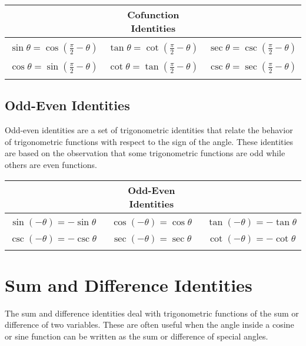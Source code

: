 \documentclass[11pt]{article}
\begin{document}
\begin{table}[H]
    \centering
    \begin{tabular}{|ccc|}
    \hline
         & Cofunction Identities &  \\
         \hline
         &&\\
        $\displaystyle \sin\theta = \cos\left(\frac{\pi}{2} - \theta\right)$ & $\displaystyle \tan\theta = \cot\left(\frac{\pi}{2} - \theta\right)$ & $\displaystyle \sec\theta = \csc\left(\frac{\pi}{2} - \theta\right)$ \\
         &&\\
        $\displaystyle \cos\theta = \sin\left(\frac{\pi}{2} - \theta\right)$ & $\displaystyle \cot\theta = \tan\left(\frac{\pi}{2} - \theta\right)$ & $\displaystyle \csc\theta = \sec\left(\frac{\pi}{2} - \theta\right)$ \\
         &&\\
        \hline
    \end{tabular}

\end{table}

\subsection{Odd-Even Identities}
Odd-even identities are a set of trigonometric identities that relate the behavior of trigonometric functions with respect to the sign of the angle. These identities are based on the observation that some trigonometric functions are odd while others are even functions.


\begin{table}[H]
    \centering
    \begin{tabular}{|ccc|}
    \hline
         & Odd-Even Identities & \\
         \hline
         &&\\
        $\displaystyle \sin(-\theta) = -\sin\theta$ & $\displaystyle \cos(-\theta) = \cos\theta$ & $\displaystyle \tan(-\theta) = -\tan\theta$ \\
         &&\\
        $\displaystyle \csc(-\theta) = -\csc\theta$ & $\displaystyle \sec(-\theta) = \sec\theta$ & $\displaystyle \cot(-\theta) = -\cot\theta$ \\
         &&\\
    \hline
    \end{tabular}
\end{table}

\section{Sum and Difference Identities}
The sum and difference identities deal with trigonometric functions of the sum or difference of two variables. These are often useful when the angle inside a cosine or sine function can be written as the sum or difference of special angles.
\end{document}
